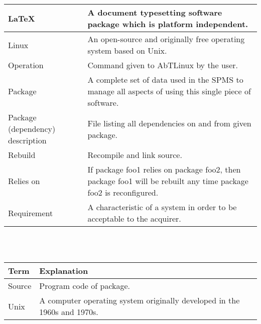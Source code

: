 \begin{tabular}[t]{|p{4.5cm}|p{8.5cm}|}
\hline
LaTeX & A document typesetting software package which is platform independent.\\
\hline
Linux & An open-source and originally free operating system based on Unix.\\
\hline
Operation & Command given to AbTLinux by the user.\\
\hline 
Package & A complete set of data used in the SPMS to manage all aspects of using this single piece of software.\\
\hline
Package (dependency) description & File listing all dependencies on and from given package.\\
\hline
Rebuild & Recompile and link source.\\
\hline
Relies on & If package foo1 relies on package foo2, then package foo1 will be rebuilt any time package foo2 is reconfigured.\\
\hline
Requirement & A characteristic of a system in order to be acceptable to the acquirer.\\
\hline
\end{tabular}
\\
\\

\begin{tabular}[t]{|p{4.5cm}|p{8.5cm}|}
\hline
\textbf{Term} & \textbf{Explanation} \\
\hline
Source & Program code of package.\\
\hline
Unix	& A computer operating system originally developed in the 1960s and 1970s.\\
\hline
\end{tabular}
